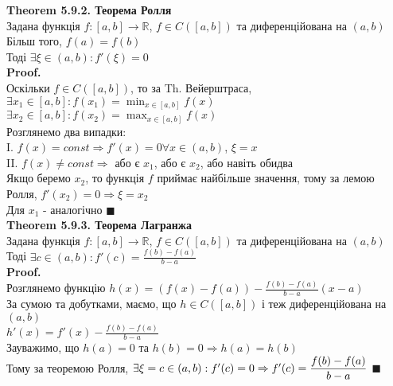 \documentclass[a4paper, 14pt]{extarticle}
\def\huge{\displaystyle}
\def\bigline{\vspace{5mm}\\}
\def\th#1{\textbf{Theorem {#1}}}
\def\proof{\textbf{Proof.}\\}
\def\bigline{\vspace{5mm}\\}
\def\qed{$\blacksquare$}
\begin{document}
\begin{figure}[H]
\centering
{}
\end{figure}

\th{5.9.2. Теорема Ролля}\\
Задана функція $f: [a,b] \to \mathbb{R}$, $f \in C([a,b])$ та диференційована на $(a,b)$\\
Більш того, $f(a) = f(b)$\\
Тоді $\exists \xi \in (a,b): f'(\xi) = 0$\\
\proof
Оскільки $f \in C([a,b])$, то за Th. Вейерштраса,\\
$\exists x_1 \in [a,b]: f(x_1) = \huge \min_{x \in [a,b]} f(x)$\\
$\exists x_2 \in [a,b]: f(x_2) = \huge \max_{x \in [a,b]} f(x)$\\
Розглянемо два випадки:\\
I. $f(x) = const \Rightarrow f'(x) = 0 \forall x \in (a,b)$, $\xi = x$\\
II. $f(x) \neq const \Rightarrow$ або є $x_1$, або є $x_2$, або навіть обидва\\
Якщо беремо $x_2$, то функція $f$ приймає найбільше значення, тому за лемою Ролля, $f'(x_2) = 0 \Rightarrow \xi = x_2$\\
Для $x_1$ - аналогічно \qed
\bigline
\th{5.9.3. Теорема Лагранжа}\\
Задана функція $f: [a,b] \to \mathbb{R}$, $f \in C([a,b])$ та диференційована на $(a,b)$\\
Тоді $\exists c \in (a,b): f'(c) = \huge \frac{f(b)-f(a)}{b-a}$\\
\proof
Розглянемо функцію $h(x) = \huge (f(x)-f(a))- \frac{f(b)-f(a)}{b-a}(x-a)$\\
За сумою та добутками, маємо, що $h \in C([a,b])$ і теж диференційована на $(a,b)$\\
$h'(x) = \huge f'(x) - \frac{f(b)-f(a)}{b-a}$\\
Зауважимо, що $h(a) = 0$ та $h(b) = 0 \Rightarrow h(a) = h(b)$\\
Тому за теоремою Ролля, $\exists \xi = c \in (a,b): f'(c) = 0 \\ \Rightarrow f'(c) = \huge \frac{f(b)-f(a)}{b-a}$ \qed
\end{document}
